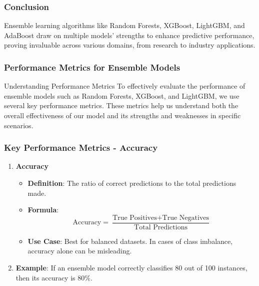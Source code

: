 \documentclass[aspectratio=169]{beamer}
\begin{document}
\begin{frame}
    \frametitle{Conclusion}
    Ensemble learning algorithms like Random Forests, XGBoost, LightGBM, and AdaBoost draw on multiple models' strengths to enhance predictive performance, proving invaluable across various domains, from research to industry applications.
\end{frame}

\begin{frame}[fragile]
    \frametitle{Performance Metrics for Ensemble Models}
    \begin{block}{Understanding Performance Metrics}
        To effectively evaluate the performance of ensemble models such as Random Forests, XGBoost, and LightGBM, we use several key performance metrics. 
        These metrics help us understand both the overall effectiveness of our model and its strengths and weaknesses in specific scenarios.
    \end{block}
\end{frame}

\begin{frame}[fragile]
    \frametitle{Key Performance Metrics - Accuracy}
    \begin{enumerate}
        \item \textbf{Accuracy}
        \begin{itemize}
            \item \textbf{Definition}: The ratio of correct predictions to the total predictions made.
            \item \textbf{Formula}:
            \begin{equation}
                \text{Accuracy} = \frac{\text{True Positives} + \text{True Negatives}}{\text{Total Predictions}}
            \end{equation}
            \item \textbf{Use Case}: Best for balanced datasets. In cases of class imbalance, accuracy alone can be misleading.
        \end{itemize}
        \item \textbf{Example}: If an ensemble model correctly classifies 80 out of 100 instances, then its accuracy is 80\%.
    \end{enumerate}
\end{frame}
\end{document}
